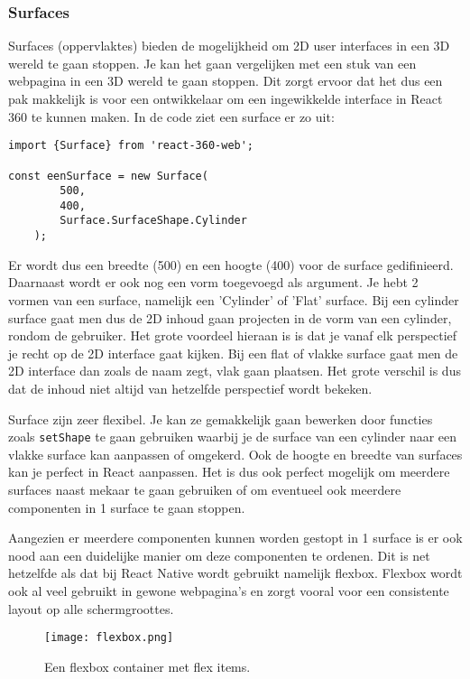\subsubsection{Surfaces}
\label{ssubsec:surfaces}
Surfaces (oppervlaktes) bieden de mogelijkheid om 2D user interfaces in een 3D wereld te gaan stoppen. Je kan het gaan vergelijken met een stuk van een webpagina in een 3D wereld te gaan stoppen. Dit zorgt ervoor dat het dus een pak makkelijk is voor een ontwikkelaar om een ingewikkelde interface in React 360 te kunnen maken. In de code ziet een surface er zo uit:

\begin{lstlisting}[frame=single, caption=Voorbeeld van een surface]
import {Surface} from 'react-360-web';

const eenSurface = new Surface(
		500,
		400,
		Surface.SurfaceShape.Cylinder
	);
\end{lstlisting}

Er wordt dus een breedte (500) en een hoogte (400) voor de surface gedifinieerd. Daarnaast wordt er ook nog een vorm toegevoegd als argument. Je hebt 2 vormen van een surface, namelijk een 'Cylinder' of 'Flat' surface. Bij een cylinder surface gaat men dus de 2D inhoud gaan projecten in de vorm van een cylinder, rondom de gebruiker. Het grote voordeel hieraan is is dat je vanaf elk perspectief je recht op de 2D interface gaat kijken. Bij een flat of vlakke surface gaat men de 2D interface dan zoals de naam zegt, vlak gaan plaatsen. Het grote verschil is dus dat de inhoud niet altijd van hetzelfde perspectief wordt bekeken.

Surface zijn zeer flexibel. Je kan ze gemakkelijk gaan bewerken door functies zoals \lstinline[basicstyle=\ttfamily\color{red}]|setShape| te gaan gebruiken waarbij je de surface van een cylinder naar een vlakke surface kan aanpassen of omgekerd. Ook de hoogte en breedte van surfaces kan je perfect in React aanpassen. Het is dus ook perfect mogelijk om meerdere surfaces naast mekaar te gaan gebruiken of om eventueel ook meerdere componenten in 1 surface te gaan stoppen. 

Aangezien er meerdere componenten kunnen worden gestopt in 1 surface is er ook nood aan een duidelijke manier om deze componenten te ordenen. Dit is net hetzelfde als dat bij React Native wordt gebruikt namelijk flexbox. Flexbox wordt ook al veel gebruikt in gewone webpagina's en zorgt vooral voor een consistente layout op alle schermgroottes.

\begin{figure}[H]
	\centering
	\texttt{[image: flexbox.png]}
	\caption{Een flexbox container met flex items.}
	\label{fig:flexbox}
\end{figure}

